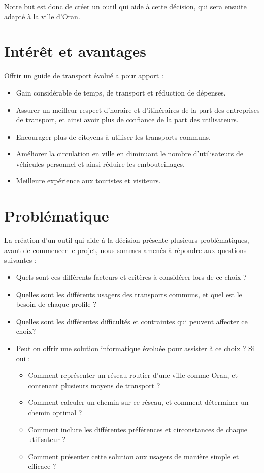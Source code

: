 Notre but est donc de créer un outil qui aide à cette décision, qui sera ensuite adapté à la ville d’Oran.

\section{Intérêt et avantages}
Offrir un guide de transport évolué a pour apport :
\begin{itemize}
	\item Gain considérable de temps, de transport et réduction de dépenses.
	\item Assurer un meilleur respect d'horaire et d'itinéraires de la part des entreprises de transport, et ainsi avoir plus de confiance de la part des utilisateurs.
	\item Encourager plus de citoyens à utiliser les transports communs.
	\item Améliorer la circulation en ville en diminuant le nombre d'utilisateurs de véhicules personnel et ainsi réduire les embouteillages.
	\item Meilleure expérience aux touristes et visiteurs.
\end{itemize}

\section{Problématique}

La création d'un outil qui aide à la décision présente plusieurs problématiques, avant de commencer le projet, nous sommes amenés à répondre aux questions suivantes :
\begin{itemize}
	\item Quels sont ces différents facteurs et critères à considérer lors de ce choix ?
	\item Quelles sont les différents usagers des transports communs, et quel est le besoin de chaque profile ?
	\item Quelles sont les différentes difficultés et contraintes qui peuvent affecter ce choix?
	\item Peut on offrir une solution informatique évoluée pour assister à ce choix ? Si oui : 
	      \begin{itemize}
	      	\item Comment représenter un réseau routier d'une ville comme Oran, et contenant plusieurs moyens de transport ?
	      	\item Comment calculer un chemin sur ce réseau, et comment déterminer un chemin optimal ?
	      	\item Comment inclure les différentes préférences et circonstances de chaque utilisateur ?
	      	\item Comment présenter cette solution aux usagers de manière simple et efficace ?
	      \end{itemize}
\end{itemize}
			
